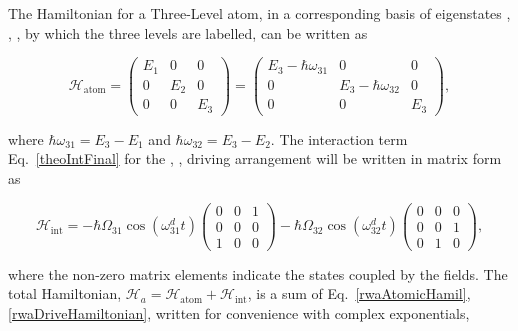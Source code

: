   The Hamiltonian for a Three-Level atom, in a corresponding basis of eigenstates , , , by which the three levels are labelled, can be written as
  
  \begin{equation}
	  \mathcal{H}_{\text{atom}} = \begin{pmatrix}
	  E_1 & 0 & 0\\0& E_2 & 0 \\0&0&E_3
	  \end{pmatrix}=\begin{pmatrix}
	  E_3-\hbar\omega_{31} & 0 & 0\\0& E_3-\hbar\omega_{32} & 0 \\0&0&E_3
	  \end{pmatrix},
	  \label{rwaAtomicHamil}
  \end{equation}
  
  \noindent where $ \hbar\omega_{31} = E_3-E_1 $ and $ \hbar\omega_{32} = E_3-E_2$. The interaction term Eq.~\eqref{theoIntFinal} for the \lra{}, \lra{}, driving arrangement will be written in matrix form as
  
  \begin{equation}
  	\mathcal{H}_{\text{int}} = -\hbar\Omega_{31}\cos(\omega_{31}^{d}t) \begin{pmatrix}
  		0 & 0 & 1\\0&0&0\\1&0&0
  	\end{pmatrix}-\hbar\Omega_{32}\cos(\omega_{32}^{d}t) \begin{pmatrix}
  		0 & 0 & 0\\0&0&1\\0&1&0
  	\end{pmatrix},
  	\label{rwaDriveHamiltonian}
  \end{equation}
  
  \noindent where the non-zero matrix elements indicate the states coupled by the fields. The total Hamiltonian, $ \mathcal{H}_{a} = \mathcal{H}_{\text{atom}}+\mathcal{H}_{\text{int}}$, is a sum of Eq.~\eqref{rwaAtomicHamil}, \eqref{rwaDriveHamiltonian}, written for convenience with complex exponentials,
  
